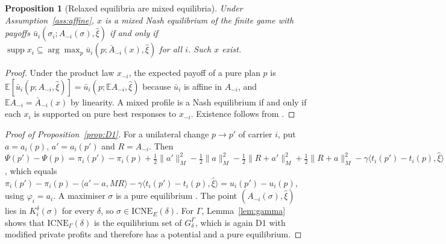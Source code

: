 \documentclass[preprint,12pt]{elsarticle}
\newtheorem{proposition}[theorem]{Proposition}
\theoremstyle{definition}
\theoremstyle{remark}
\newcommand{\E}{\mathbb{E}}
\newcommand{\ub}{\bar u}
\newcommand{\Abar}{\bar A}
\newcommand{\supp}{\operatorname{supp}}
\newcommand{\ICNE}{\mathrm{ICNE}}
\newcommand{\ip}[2]{\langle #1,#2\rangle}
\begin{document}
\begin{proposition}[Relaxed equilibria are mixed equilibria]\label{prop:relaxed}
Under Assumption~\ref{ass:affine}, $x$ is a mixed Nash equilibrium of the finite game with payoffs $\ub_i(\sigma_i;A_{-i}(\sigma),\hat\xi)$ if and only if $\supp x_i\subseteq\arg\max_p\ub_i(p;\Abar_{-i}(x),\hat\xi)$ for all $i$. Such $x$ exist.
\end{proposition}
\begin{proof}
Under the product law $x_{-i}$, the expected payoff of a pure plan $p$ is $\E[\ub_i(p;A_{-i},\hat\xi)]=\ub_i(p;\E A_{-i},\hat\xi)$ because $\ub_i$ is affine in $A_{-i}$, and $\E A_{-i}=\Abar_{-i}(x)$ by linearity. A mixed profile is a Nash equilibrium if and only if each $x_i$ is supported on pure best responses to $x_{-i}$. Existence follows from \citet{Nash1951}.
\end{proof}

\begin{proof}[Proof of Proposition~\ref{prop:D1}]
For a unilateral change $p\to p'$ of carrier $i$, put $a=a_i(p)$, $a'=a_i(p')$ and $R=A_{-i}$. Then $\Psi(p')-\Psi(p)=\pi_i(p')-\pi_i(p)+\tfrac12\|a'\|_M^2-\tfrac12\|a\|^2_M-\tfrac12\|R+a'\|_M^2+\tfrac12\|R+a\|_M^2-\gamma\ip{t_i(p')-t_i(p)}{\hat\xi}$, which equals $\pi_i(p')-\pi_i(p)-\ip{a'-a}{MR}-\gamma\ip{t_i(p')-t_i(p)}{\hat\xi}=u_i(p')-u_i(p)$, using $\varphi_i=a_i$. A maximiser $\sigma$ is a pure equilibrium \citep{Monderer1996}. The point $(A_{-i}(\sigma),\hat\xi)$ lies in $K_i^\delta(\sigma)$ for every $\delta$, so $\sigma\in\ICNE_E(\delta)$. For $\Gamma$, Lemma~\ref{lem:gamma} shows that $\ICNE_\Gamma(\delta)$ is the equilibrium set of $G^\Gamma_\delta$, which is again D1 with modified private profits and therefore has a potential and a pure equilibrium.
\end{proof}
\end{document}
